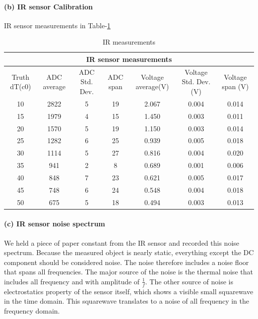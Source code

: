 \documentclass[a4paper]{article}
\begin{document}
\paragraph{(b) IR sensor Calibration}	IR sensor measurements in Table-\ref{tab2}

\begin{table}
\tiny
\center
  \begin{tabular}{|c|c|c|c|c|c|c|}
    \hline
    \multicolumn{7}{|c|}{IR sensor measurements} \\
    \hline
    Truth dT(c0) & ADC average & ADC Std. Dev. & ADC span & Voltage average(V) & Voltage Std. Dev.(V) & Voltage span (V)\\
    \hline
	10 & 2822 & 5 & 19 & 2.067 & 0.004 & 0.014\\
	15 & 1979 & 4 & 15 & 1.450 & 0.003 & 0.011\\
	20 & 1570 & 5 & 19 & 1.150 & 0.003 & 0.014\\
	25 & 1282 & 6 & 25 & 0.939 & 0.005 & 0.018\\
	30 & 1114 & 5 & 27 & 0.816 & 0.004 & 0.020\\
	35 & 941 & 2 & 8 & 0.689 & 0.001 & 0.006\\
	40 & 848 & 7 & 23 & 0.621 & 0.005 & 0.017\\
	45 & 748 & 6 & 24 & 0.548 & 0.004 & 0.018\\
	50 & 675 & 5 & 18 & 0.494 & 0.003 & 0.013\\
    \hline
  \end{tabular}
  \caption{IR measurements}
  \label{tab2}
\end{table}

\paragraph{(c) IR sensor noise spectrum} We held a piece of paper constant from the IR sensor and recorded this noise
spectrum. Because the measured object is nearly static, everything except the DC component should be considered noise.
The noise therefore includes a noise floor that spans all frequencies. The major source of the noise is the thermal noise
that includes all frequency and with amplitude of $ \frac{1}{f} $. The other source of noise is electrostatics property
of the sensor itself, which shows a visible small squarewave in the time domain. This squarewave translates to a noise
of all frequency in the frequency domain.
\end{document}
